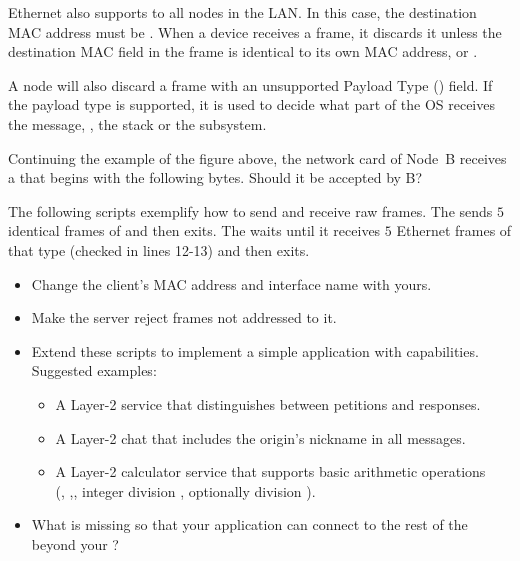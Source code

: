 Ethernet also supports  to all nodes in the LAN. In this case, the destination
MAC address must be .
% 
When a device receives a frame, it discards it unless the destination MAC field in the frame
is identical to its own MAC address, or . 

A node will also discard a frame with an unsupported Payload Type () field. 
% 
If the payload type is supported, it is used to decide what part of the OS receives the message,
\eg, the  stack or the  subsystem.

\begin{exercise} Continuing the example of the figure above, the network card of Node~B receives
a  that begins with the following bytes. Should it be accepted by B?
\begin{center}
\end{center}
\end{exercise}

\begin{exercise}
The following scripts exemplify how to send and receive raw  frames. 
The  sends $5$ identical frames of   and then exits.
The  waits until it receives $5$ Ethernet frames of that type (checked in lines 12-13) and then exits.
% 
\begin{itemize}
\item Change the client's MAC address and interface name with yours.
\item Make the server reject frames not addressed to it.
\item Extend these scripts to implement a simple application with  capabilities.\\
  Suggested examples:
    \begin{itemize}
    \item A Layer-2  service that distinguishes between petitions and responses.
    \item A Layer-2  chat that includes the origin's nickname in all messages.
    \item A Layer-2 calculator service that supports basic arithmetic operations\\
      (\inlineCode{+}, \inlineCode{-},\inlineCode{*}, integer division \inlineCode{//}, optionally division \inlineCode{/}).
    \end{itemize}
\item What is missing so that your application can connect to the rest of the  beyond your ?
\end{itemize}

\label{ex:layer2:echo}
\end{exercise}

